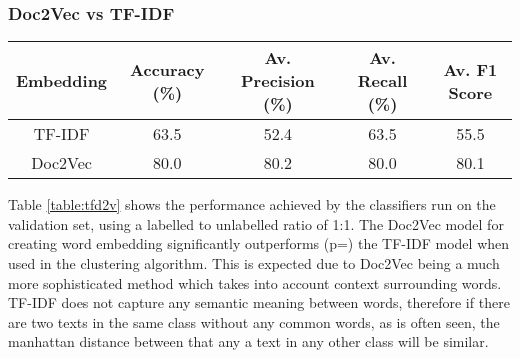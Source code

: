\documentclass[12pt,a4paper,twoside,openright]{report}
\begin{document}
\subsubsection{Doc2Vec vs TF-IDF}
\begin{table*}[h]
\centering
\begin{tabular}{|c|c|c|c|c|}
\hline
Embedding & Accuracy (\%) & Av. Precision (\%) & Av. Recall (\%) & Av. F1 Score\\ \hline \hline
TF-IDF & 63.5 & 52.4 & 63.5 & 55.5 \\ \hline
Doc2Vec & 80.0 & 80.2 & 80.0 & 80.1 \\ \hline
\end{tabular}
\caption{Performance metrics for each embedding type} \label{table:tfd2v}
\end{table*}
\noindent
Table \ref{table:tfd2v} shows the performance achieved by the classifiers run on the validation set, using a labelled to unlabelled ratio of 1:1. The Doc2Vec model for creating word embedding significantly outperforms (p=) the TF-IDF model when used in the clustering algorithm. This is expected due to Doc2Vec being a much more sophisticated method which takes into account context surrounding words. TF-IDF does not capture any semantic meaning between words, therefore if there are two texts in the same class without any common words, as is often seen, the manhattan distance between that any a text in any other class will be similar. 
\end{document}
